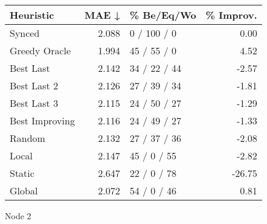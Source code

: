 \begin{tabular}{lrlr}
\toprule
\textbf{Heuristic} & \textbf{MAE ↓} & \textbf{\% Be/Eq/Wo} & \textbf{\% Improv.} \\
\midrule
            Synced &          2.088 &          0 / 100 / 0 &                0.00 \\
     Greedy Oracle &          1.994 &          45 / 55 / 0 &                4.52 \\
         Best Last &          2.142 &         34 / 22 / 44 &               -2.57 \\
       Best Last 2 &          2.126 &         27 / 39 / 34 &               -1.81 \\
       Best Last 3 &          2.115 &         24 / 50 / 27 &               -1.29 \\
    Best Improving &          2.116 &         24 / 49 / 27 &               -1.33 \\
            Random &          2.132 &         27 / 37 / 36 &               -2.08 \\
             Local &          2.147 &          45 / 0 / 55 &               -2.82 \\
            Static &          2.647 &          22 / 0 / 78 &              -26.75 \\
            Global &          2.072 &          54 / 0 / 46 &                0.81 \\
\bottomrule
\end{tabular}
\caption{Node 2}
\label{tab:hr_non_lr05_le1_bs2_2}
